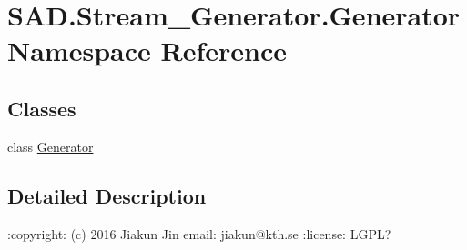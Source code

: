 \hypertarget{namespaceSAD_1_1Stream__Generator_1_1Generator}{}\section{S\+A\+D.\+Stream\+\_\+\+Generator.\+Generator Namespace Reference}
\label{namespaceSAD_1_1Stream__Generator_1_1Generator}
\subsection*{Classes}
\begin{DoxyCompactItemize}
\item 
class \hyperlink{classSAD_1_1Stream__Generator_1_1Generator_1_1Generator}{Generator}
\end{DoxyCompactItemize}


\subsection{Detailed Description}
\begin{DoxyVerb}:copyright: (c) 2016 Jiakun Jin
email: jiakun@kth.se
:license: LGPL?
\end{DoxyVerb}
 